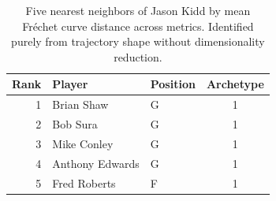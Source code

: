 \begin{table}[htbp]
  \centering\small
  \begin{tabular}{rllc}
    \toprule
    Rank & Player & Position & Archetype \\
    \midrule
    1 & Brian Shaw & G & 1 \\
    2 & Bob Sura & G & 1 \\
    3 & Mike Conley & G & 1 \\
    4 & Anthony Edwards & G & 1 \\
    5 & Fred Roberts & F & 1 \\
    \bottomrule
  \end{tabular}
  \caption{Five nearest neighbors of Jason Kidd by mean Fr\'{e}chet curve distance across metrics. Identified purely from trajectory shape without dimensionality reduction.}
  \label{tab:Jason_Kidd_frechet_curve_neighbors}
\end{table}

